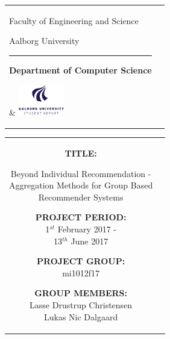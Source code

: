 \begin{titlepage}
\thispagestyle{empty}

\begin{nopagebreak}
{\samepage

\begin{tabular}{lr}
        \parbox{14.5cm}{
          {\LARGE Faculty of Engineering and Science}

          {\small Aalborg University}
          \vspace{-0.3cm}\\
        \hrule
        \vspace{0.2cm}
          {\bf Department of Computer Science}
         }   & \hspace{-2.0cm} \includegraphics[width=2cm]{graphics/aau_logo_en}
\end{tabular}

\begin{tabular}{cc}
\parbox{7cm}{
\hspace{2cm}
\begin{description}

\item {\bf TITLE:}

\noindent Beyond Individual Recommendation - \\
Aggregation Methods for Group Based \\Recommender Systems


\end{description}

\parbox{8cm}{

\begin{description}
        \item {\bf PROJECT PERIOD:}\\
          1$^{st}$ February 2017 -\\ 13$^{th}$ June 2017\\
          \hspace{4cm}
        \item {\bf PROJECT GROUP:}\\
          mi1012f17\\
          \hspace{4cm}
        \item {\bf GROUP MEMBERS:}\\
          Lasse Drustrup Christensen \\
          Lukas Nic Dalgaard 
          \hspace{2cm}
          

\end{description}}}
\end{tabular}}
\end{nopagebreak}
\end{titlepage}

